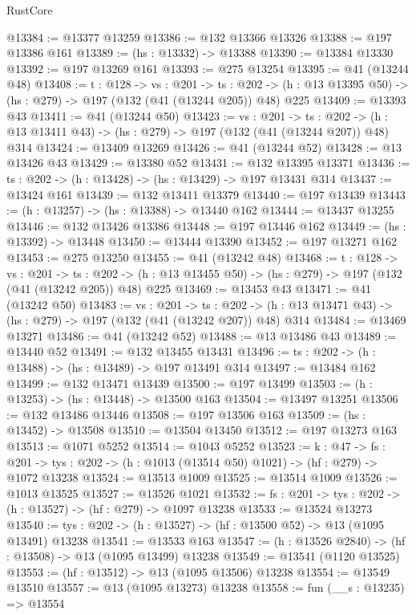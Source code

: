 \begin{lexlean}{RustCore}
\begin{coremodule}
@13384 := @13377 @13259
@13386 := @132 @13366 @13326
@13388 := @197 @13386 @161
@13389 := (hs : @13332) -> @13388
@13390 := @13384 @13330
@13392 := @197 @13269 @161
@13393 := @275 @13254
@13395 := @41 (@13244 @48)
@13408 := {t : @128} ->
  {vs : @201} ->
  {ts : @202} -> (h : @13 @13395 @50) -> (hs : @279) -> @197 (@132 (@41 (@13244 @205)) @48) @225
@13409 := @13393 @43
@13411 := @41 (@13244 @50)
@13423 := {vs : @201} ->
  {ts : @202} -> (h : @13 @13411 @43) -> (hs : @279) -> @197 (@132 (@41 (@13244 @207)) @48) @314
@13424 := @13409 @13269
@13426 := @41 (@13244 @52)
@13428 := @13 @13426 @43
@13429 := @13380 @52
@13431 := @132 @13395 @13371
@13436 := {ts : @202} -> (h : @13428) -> (hs : @13429) -> @197 @13431 @314
@13437 := @13424 @161
@13439 := @132 @13411 @13379
@13440 := @197 @13439
@13443 := (h : @13257) -> (hs : @13388) -> @13440 @162
@13444 := @13437 @13255
@13446 := @132 @13426 @13386
@13448 := @197 @13446 @162
@13449 := (hs : @13392) -> @13448
@13450 := @13444 @13390
@13452 := @197 @13271 @162
@13453 := @275 @13250
@13455 := @41 (@13242 @48)
@13468 := {t : @128} ->
  {vs : @201} ->
  {ts : @202} -> (h : @13 @13455 @50) -> (hs : @279) -> @197 (@132 (@41 (@13242 @205)) @48) @225
@13469 := @13453 @43
@13471 := @41 (@13242 @50)
@13483 := {vs : @201} ->
  {ts : @202} -> (h : @13 @13471 @43) -> (hs : @279) -> @197 (@132 (@41 (@13242 @207)) @48) @314
@13484 := @13469 @13271
@13486 := @41 (@13242 @52)
@13488 := @13 @13486 @43
@13489 := @13440 @52
@13491 := @132 @13455 @13431
@13496 := {ts : @202} -> (h : @13488) -> (hs : @13489) -> @197 @13491 @314
@13497 := @13484 @162
@13499 := @132 @13471 @13439
@13500 := @197 @13499
@13503 := (h : @13253) -> (hs : @13448) -> @13500 @163
@13504 := @13497 @13251
@13506 := @132 @13486 @13446
@13508 := @197 @13506 @163
@13509 := (hs : @13452) -> @13508
@13510 := @13504 @13450
@13512 := @197 @13273 @163
@13513 := @1071 @5252
@13514 := @1043 @5252
@13523 := {k : @47} ->
  {fs : @201} -> {tys : @202} -> (h : @1013 (@13514 @50) @1021) -> (hf : @279) -> @1072 @13238
@13524 := @13513 @1009
@13525 := @13514 @1009
@13526 := @1013 @13525
@13527 := @13526 @1021
@13532 := {fs : @201} -> {tys : @202} -> (h : @13527) -> (hf : @279) -> @1097 @13238
@13533 := @13524 @13273
@13540 := {tys : @202} -> (h : @13527) -> (hf : @13500 @52) -> @13 (@1095 @13491) @13238
@13541 := @13533 @163
@13547 := (h : @13526 @2840) -> (hf : @13508) -> @13 (@1095 @13499) @13238
@13549 := @13541 (@1120 @13525)
@13553 := (hf : @13512) -> @13 (@1095 @13506) @13238
@13554 := @13549 @13510
@13557 := @13 (@1095 @13273) @13238
@13558 := fun (__s : @13235) => @13554

\end{coremodule}
\end{lexlean}
